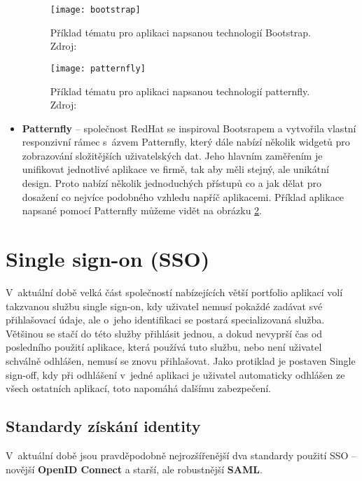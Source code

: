 \begin{itemize}
\begin{figure}[h!]
\centering
\texttt{[image: bootstrap]}
\caption[Příklad tématu pro aplikaci napsanou technologií Bootstrap]{Příklad tématu pro aplikaci napsanou technologií Bootstrap. Zdroj: \cite{bootstrap}}
\label{bootstrap-fig}
\end{figure}
\begin{figure}[h!]
\centering
\texttt{[image: patternfly]}
\caption[Příklad tématu pro aplikaci napsanou technologií patternfly]{Příklad tématu pro aplikaci napsanou technologií patternfly. Zdroj: \cite{patternfly}}
\label{patternfly-fig}
\end{figure}
\newpage
\item \textbf{Patternfly} -- společnost RedHat se inspiroval Bootsrapem a vytvořila vlastní responzivní rámec s~ázvem Patternfly, který dále nabízí několik widgetů pro zobrazování složitějších uživatelských dat. Jeho hlavním zaměřením je unifikovat jednotlivé aplikace ve firmě, tak aby měli stejný, ale unikátní design. Proto nabízí několik jednoduchých přístupů co a jak dělat pro dosažení co nejvíce podobného vzhledu napříč aplikacemi. \cite{patternfly} Příklad aplikace napsané pomocí Patternfly můžeme vidět na obrázku \ref{patternfly-fig}.
\end{itemize}
\clearpage
\section{Single sign-on (SSO)}
\par V~aktuální době velká část společností nabízejících větší portfolio aplikací volí takzvanou službu single sign-on, kdy uživatel nemusí pokaždé zadávat své přihlašovací údaje, ale o~jeho identifikaci se postará specializovaná služba. Většinou se stačí do této služby přihlásit jednou, a dokud nevyprší čas od posledního použití aplikace, která používá tuto službu, nebo není uživatel schválně odhlášen, nemusí se znovu přihlašovat. Jako protiklad je postaven Single sign-off, kdy při odhlášení v~jedné aplikaci je uživatel automaticky odhlášen ze všech ostatních aplikací, toto napomáhá dalšímu zabezpečení.

\subsection{Standardy získání identity}
\par V~aktuální době jsou pravděpodobně nejrozšířenější dva standardy použití SSO -- novější \textbf{OpenID Connect} a starší, ale robustnější \textbf{SAML}.

